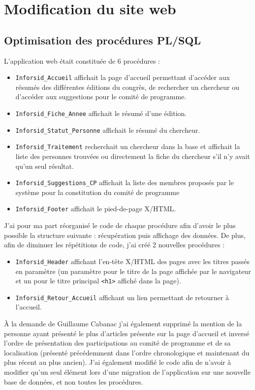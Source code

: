	\section{Modification du site web}
			
		\subsection{Optimisation des procédures PL/SQL}
			L\rq{}application web était constituée de 6 procédures :
			\begin{itemize}
				\item \texttt{Inforsid\_Accueil} affichait la page d\rq{}accueil permettant d\rq{}accéder aux résumés des différentes éditions du congrès, de rechercher un chercheur ou d\rq{}accéder aux suggestions pour le comité de programme.
				\item \texttt{Inforsid\_Fiche\_Annee} affichait le résumé d\rq{}une édition.
				\item \texttt{Inforsid\_Statut\_Personne} affichait le résumé du chercheur.
				\item \texttt{Inforsid\_Traitement} recherchait un chercheur dans la base et affichait la liste des personnes trouvées ou directement la fiche du chercheur s\rq{}il n\rq{}y avait qu\rq{}un seul résultat.
				\item \texttt{Inforsid\_Suggestions\_CP} affichait la liste des membres proposés par le système pour la constitution du comité de programme
				\item \texttt{Inforsid\_Footer} affichait le pied-de-page X/HTML.
			\end{itemize}
				
			J\rq{}ai pour ma part réorganisé le code de chaque procédure afin d\rq{}avoir le plus possible la structure suivante : récupération puis affichage des données. De plus, afin de diminuer les répétitions de code, j\rq{}ai créé 2 nouvelles procédures :
			\begin{itemize}
				\item \texttt{Inforsid\_Header} affichant l\rq{}en-tête X/HTML des pages avec les titres passés en paramètre (un paramètre pour le titre de la page affichée par le navigateur et un pour le titre principal \texttt{<h1>} affiché dans la page).
				\item \texttt{Inforsid\_Retour\_Accueil} affichant un lien permettant de retourner à l\rq{}accueil.
			\end{itemize}
			
			À la demande de Guillaume Cabanac j\rq{}ai également supprimé la mention de la personne ayant présenté le plus d\rq{}articles présente sur la page d\rq{}accueil et inversé l\rq{}ordre de présentation des participations au comité de programme et de sa localisation (présenté précédemment dans l\rq{}ordre chronologique et maintenant du plus récent au plus ancien). J\rq{}ai également modifié le code afin de n'avoir à modifier qu'un seul élément lors d\rq{}une migration de l'application sur une nouvelle base de données, et non toutes les procédures.
			
